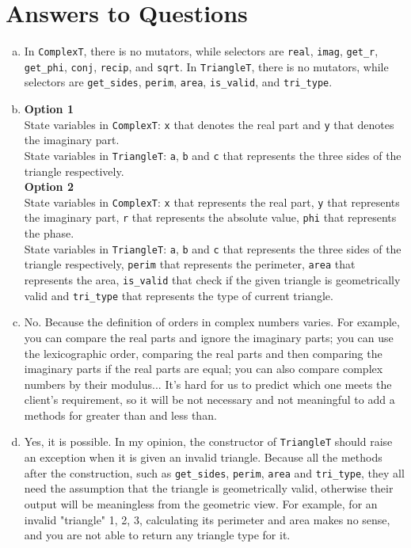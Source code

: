 \documentclass[12pt]{article}
\begin{document}
\section{Answers to Questions}
\begin{enumerate}[(a)]
\item In \verb|ComplexT|, there is no mutators, while selectors are  \verb|real|, \verb|imag|, \verb|get_r|, \verb|get_phi|, \verb|conj|, \verb|recip|,  and \verb|sqrt|. In  \verb|TriangleT|, there is no mutators, while selectors are \verb|get_sides|, \verb|perim|, \verb|area|, \verb|is_valid|, and \verb|tri_type|.
\item  \textbf{Option 1} \\ State variables in \verb|ComplexT|: \verb|x| that denotes the real part and \verb|y| that denotes the imaginary part. \\ State variables in \verb|TriangleT|: \verb|a|, \verb|b| and \verb|c| that represents the three sides of the triangle respectively. \\
\textbf{Option 2} \\ State variables in \verb|ComplexT|: \verb|x| that represents the real part, \verb|y| that represents the imaginary part, \verb|r| that represents the absolute value, \verb|phi| that represents the phase.\\ State variables in \verb|TriangleT|: \verb|a|, \verb|b| and \verb|c| that represents the three sides of the triangle respectively, \verb|perim| that represents the perimeter, \verb|area| that represents the area, \verb|is_valid| that check if the given triangle is geometrically valid and \verb|tri_type| that represents the type of current triangle.
\item No. Because the definition of orders in complex numbers varies. For example, you can compare the real parts and ignore the imaginary parts; you can use the lexicographic order, comparing the real parts and then comparing the imaginary parts if the real parts are equal; you can also compare complex numbers by their modulus... It's hard for us to  predict which one meets the client's requirement, so it will be not necessary and not meaningful to add a methods for greater than and less than. 
\item Yes, it is possible. In my opinion, the constructor of \verb|TriangleT| should raise an exception when it is given an invalid triangle. Because all the methods after the construction, such as \verb|get_sides|, \verb|perim|, \verb|area| and \verb|tri_type|, they all need the assumption that the triangle is geometrically valid, otherwise their output will be meaningless from the geometric view. For example, for an invalid "triangle" {1, 2, 3}, calculating its perimeter and area makes no sense, and you are not able to return any triangle type for it.

\end{enumerate}
\end{document}
